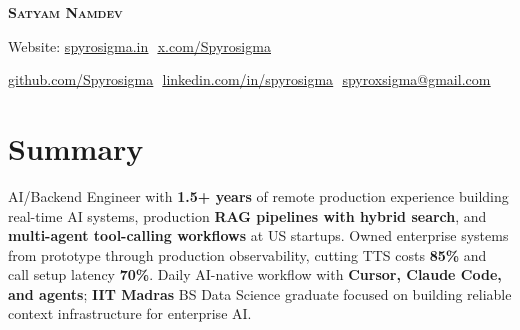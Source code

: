 \documentclass[a4paper,10pt]{article}
\begin{document}
\selectfont


\begin{flushright}
  \vspace{-4pt}
  \color{black}
  \item
\end{flushright}

\vspace{-50pt}

\begin{center}
    \textbf{\Huge \scshape Satyam Namdev}
    \vspace{1mm}

    Website:
    \href{https://spyrosigma.in}{\underline{spyrosigma.in}}
    $ $
    \href{https://x.com/Spyrosigma}{\underline{x.com/Spyrosigma}}

    \vspace{8pt}
    \small
    \href{https://github.com/Spyrosigma}{\underline{github.com/Spyrosigma}} $  $
    \href{https://www.linkedin.com/in/spyrosigma}{\underline{linkedin.com/in/spyrosigma}} $  $
    \href{mailto:spyroxsigma@gmail.com}{\underline{spyroxsigma@gmail.com}}
\end{center}


\section{\textbf{Summary}}
\vspace{1.5mm}
\small{
AI/Backend Engineer with \textbf{1.5+ years} of remote production experience building real-time AI systems, production \textbf{RAG pipelines with hybrid search}, and \textbf{multi-agent tool-calling workflows} at US startups. Owned enterprise systems from prototype through production observability, cutting TTS costs \textbf{85\%} and call setup latency \textbf{70\%}. Daily AI-native workflow with \textbf{Cursor, Claude Code, and agents}; \textbf{IIT Madras} BS Data Science graduate focused on building reliable context infrastructure for enterprise AI.
}
\vspace{-3mm}
\end{document}
